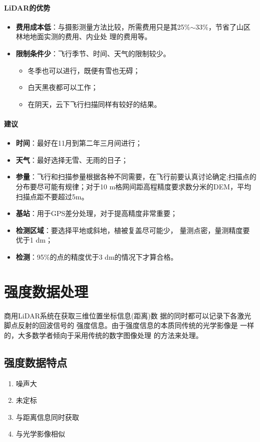 \paragraph{LiDAR的优势}
\begin{itemize}
	\item \textbf{费用成本低}：与摄影测量方法比较，所需费用只是其25\%$ \sim $33\%，节省了山区林地地面实测的费用、内业处 理的费用等。
	\item \textbf{限制条件少}：飞行季节、时间、天气的限制较少。
		\begin{itemize}
			\item 冬季也可以进行，既便有雪也无碍；
			\item 白天黑夜都可以工作；
			\item 在阴天，云下飞行扫描同样有较好的结果。
		\end{itemize}
\end{itemize}

\paragraph{建议}
\begin{itemize}
	\item \textbf{时间}：最好在11月到第二年三月间进行；
	\item \textbf{天气}：最好选择无雪、无雨的日子；
	\item \textbf{参量}：飞行和扫描参量根据各种不同需要，在飞行前要认真讨论确定;扫描点的分布要尽可能有规律；对于10 m格网间距高程精度要求数分米的DEM，平均扫描点距不要超过5m。
	\item \textbf{基站}：用于GPS差分处理，对于提高精度非常重要；
	\item \textbf{检测区域}：要选择平地或斜地，植被复盖尽可能少， 量测点密，量测精度要优于1 dm；
	\item \textbf{检测}：95\%的点的精度优于3 dm的情况下才算合格。
\end{itemize}

\section{强度数据处理}
商用LiDAR系统在获取三维位置坐标信息(距离)数
据的同时都可以记录下各激光脚点反射的回波信号的
强度信息。由于强度信息的本质同传统的光学影像是
一样的，大多数学者倾向于采用传统的数字图像处理
的方法来处理。

\subsection{强度数据特点}
\begin{enumerate}
	\item 噪声大
	\item 未定标
	\item 与距离信息同时获取
	\item 与光学影像相似
\end{enumerate}

